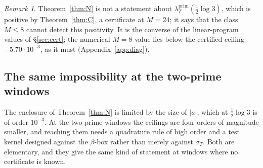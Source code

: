 \documentclass[11pt]{amsart}
\theoremstyle{definition}
\theoremstyle{remark}
\newtheorem{remark}[theorem]{Remark}
\newcommand{\lamP}{\lambda^{\mathrm{prim}}_T}
\newcommand{\sT}{\sigma_T}
\begin{document}
\begin{remark}
Theorem~\ref{thm:N} is not a statement about $\lamP(\frac12\log3)$, which is positive by
Theorem~\ref{thm:C}, a certificate at $M=24$; it says that the class $M\le8$ cannot detect this
positivity. It is the converse of the linear-program values of \S\ref{sec:cert}; the numerical
$M=8$ value lies below the certified ceiling $-5.70\cdot10^{-3}$, as it must
(Appendix~\ref{app:diag}).
\end{remark}

\subsection{The same impossibility at the two-prime windows}\label{subsec:Np}

The enclosure of Theorem~\ref{thm:N} is limited by the size of $|a|$, which at $\frac12\log3$ is of
order $10^{-3}$. At the two-prime windows the ceilings are four orders of magnitude smaller, and
reaching them needs a quadrature rule of high order and a test kernel designed against the
$\beta$-box rather than merely against $\sT$. Both are elementary, and they give the same kind of
statement at windows where no certificate is known.
\end{document}
